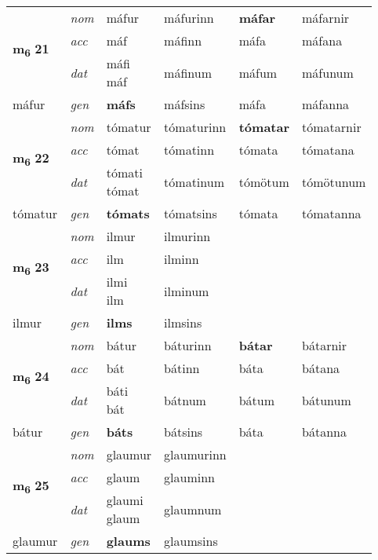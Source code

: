 \begin{longtable}[l]{X>{\footnotesize\itshape}XXXXX}
\multirow{3}{*}{{{\textbf{m{\textsubscript{6}}} \Large{\textbf{21}}}}}  
 & nom & máfur & máfurinn    & \textbf{máfar} & máfarnir  \\*
 & acc & máf  & máfinn   & máfa  & máfana \\*
 & dat & \specialcell{máfi\\ máf} & máfinum   & máfum & máfunum \\*
 {\footnotesize{máfur}} &  gen & \textbf{máfs}  & máfsins  & máfa & máfanna \\
\cmidrule{1-6}


\multirow{3}{*}{{{\textbf{m{\textsubscript{6}}} \Large{\textbf{22}}}}}  
 & nom & tómatur & tómaturinn    & \textbf{tómatar} & tómatarnir  \\*
 & acc & tómat  & tómatinn   & tómata  & tómatana \\*
 & dat & \specialcell{tómati\\ tómat} & tómatinum   & tómötum & tómötunum \\*
 {\footnotesize{tómatur}} &  gen & \textbf{tómats}  & tómatsins  & tómata & tómatanna \\
\cmidrule{1-6}


\multirow{3}{*}{{{\textbf{m{\textsubscript{6}}} \Large{\textbf{23}}}}}  
 & nom & ilmur & ilmurinn    & \textbf{} &   \\*
 & acc & ilm  & ilminn   &   &  \\*
 & dat & \specialcell{ilmi\\ ilm} & ilminum   &  &  \\*
 {\footnotesize{ilmur}} &  gen & \textbf{ilms}  & ilmsins  &  &  \\
\cmidrule{1-6}


\multirow{3}{*}{{{\textbf{m{\textsubscript{6}}} \Large{\textbf{24}}}}}  
 & nom & bátur & báturinn    & \textbf{bátar} & bátarnir  \\*
 & acc & bát  & bátinn   & báta  & bátana \\*
 & dat & \specialcell{báti\\ bát} & bátnum   & bátum & bátunum \\*
 {\footnotesize{bátur}} &  gen & \textbf{báts}  & bátsins  & báta & bátanna \\
\cmidrule{1-6}


\multirow{3}{*}{{{\textbf{m{\textsubscript{6}}} \Large{\textbf{25}}}}}  
 & nom & glaumur & glaumurinn    & \textbf{} &   \\*
 & acc & glaum  & glauminn   &   &  \\*
 & dat & \specialcell{glaumi\\ glaum} & glaumnum   &  &  \\*
 {\footnotesize{glaumur}} &  gen & \textbf{glaums}  & glaumsins  &  &  \\
\cmidrule{1-6}



\end{longtable}
